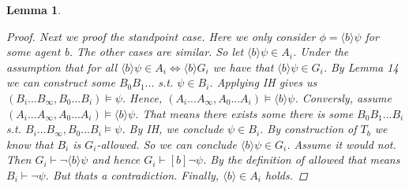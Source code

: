 \documentclass[11pt]{article}
\newtheorem{lemma}[theorem]{Lemma}
\theoremstyle{definition}
\theoremstyle{remark}
\begin{document}
\begin{lemma}
\begin{proof}
        Next we proof the standpoint case. Here we only consider $\phi = \langle b \rangle \psi$ for some agent b. The other cases are similar. So let $\langle b \rangle \psi \in A_i$. Under the assumption that for all 
        $\langle b \rangle \psi \in A_i \iff \langle b \rangle G_i$ we have that $\langle b \rangle \psi \in G_i$. By Lemma 14 we can construct some $B_0B_1...$ s.t. $\psi \in B_i$. Applying IH gives us
        $(B_i...B_\infty, B_0...B_i) \vDash \psi$. Hence, $(A_i...A_\infty,A_0...A_i) \vDash \langle b \rangle \psi$. Conversly, assume $(A_i...A_\infty, A_0...A_i) \vDash \langle b \rangle \psi$. That means there exists some
        there is some $B_0B_1...B_i$ s.t. $B_i...B_\infty, B_0...B_i \vDash \psi$. By IH, we conclude $\psi \in B_i$. By construction of $T_b$ we know that $B_i$ is $G_i$-allowed.
        So we can conclude $\langle b \rangle \psi \in G_i$. Assume it would not. Then $G_i \vdash \neg \langle b \rangle \psi$ and hence $G_i \vdash [b] \neg \psi$. By the definition of allowed that means
        $B_i \vdash \neg \psi$. But thats a contradiction. Finally, $\langle b \rangle \in A_i$ holds.
        
        

    \end{proof}
\end{lemma} 
\end{document}
